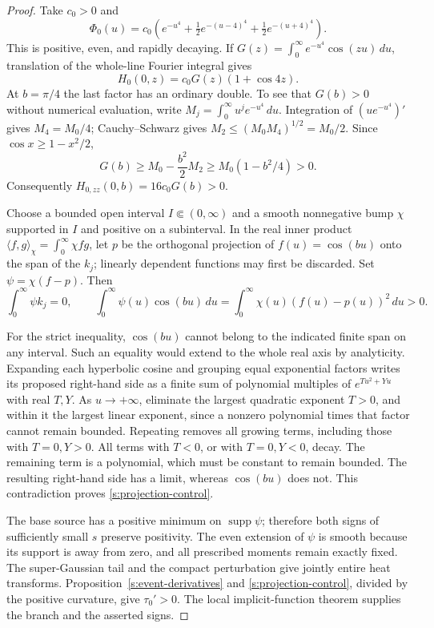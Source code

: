\begin{proof}
Take $c_0>0$ and
\[
 \Phi_0(u)=c_0\left(e^{-u^4}
          +\tfrac12e^{-(u-4)^4}+\tfrac12e^{-(u+4)^4}\right).
\]
This is positive, even, and rapidly decaying.  If
$G(z)=\int_0^\infty e^{-u^4}\cos(zu)\,du$, translation of the
whole-line Fourier integral gives
\[
 H_0(0,z)=c_0G(z)(1+\cos4z).
\]
At $b=\pi/4$ the last factor has an ordinary double.  To see that
$G(b)>0$ without numerical evaluation, write
$M_j=\int_0^\infty u^je^{-u^4}\,du$.  Integration of
$(ue^{-u^4})'$ gives $M_4=M_0/4$; Cauchy--Schwarz gives
$M_2\le(M_0M_4)^{1/2}=M_0/2$.  Since
$\cos x\ge1-x^2/2$,
\[
 G(b)\ge M_0-\frac{b^2}{2}M_2
       \ge M_0(1-b^2/4)>0.
\]
Consequently $H_{0,zz}(0,b)=16c_0G(b)>0$.

Choose a bounded open interval $I\Subset(0,\infty)$ and a smooth
nonnegative bump $\chi$ supported in $I$ and positive on a subinterval.
In the real inner product
$\langle f,g\rangle_\chi=\int_0^\infty\chi fg$, let $p$ be the
orthogonal projection of $f(u)=\cos(bu)$ onto the span of the $k_j$;
linearly dependent functions may first be discarded.  Set
$\psi=\chi(f-p)$.  Then
\begin{equation}
 \int_0^\infty\psi k_j=0,
 \qquad
 \int_0^\infty\psi(u)\cos(bu)\,du
    =\int_0^\infty\chi(u)(f(u)-p(u))^2\,du>0.
 \label{s:projection-control}
\end{equation}

For the strict inequality, $\cos(bu)$ cannot belong to the indicated
finite span on any interval.  Such an equality would extend to the
whole real axis by analyticity.  Expanding each hyperbolic cosine and
grouping equal exponential factors writes its proposed right-hand side
as a finite sum of polynomial multiples of $e^{Tu^2+Yu}$ with real
$T,Y$.  As $u\to+\infty$, eliminate the largest quadratic exponent
$T>0$, and within it the largest linear exponent, since a nonzero
polynomial times that factor cannot remain bounded.  Repeating removes
all growing terms, including those with $T=0,Y>0$.  All terms with
$T<0$, or with $T=0,Y<0$, decay.  The remaining term is a polynomial,
which must be constant to remain bounded.  The resulting right-hand
side has a limit, whereas $\cos(bu)$ does not.  This contradiction
proves \eqref{s:projection-control}.

The base source has a positive minimum on $\operatorname{supp}\psi$;
therefore both signs of sufficiently small $s$ preserve positivity.
The even extension of $\psi$ is smooth because its support is away
from zero, and all prescribed moments remain exactly fixed.  The
super-Gaussian tail and the compact perturbation give jointly entire
heat transforms.  Proposition~\ref{s:event-derivatives} and
\eqref{s:projection-control}, divided by the positive curvature,
give $\tau_0'>0$.  The local implicit-function theorem supplies the
branch and the asserted signs.
\end{proof}

